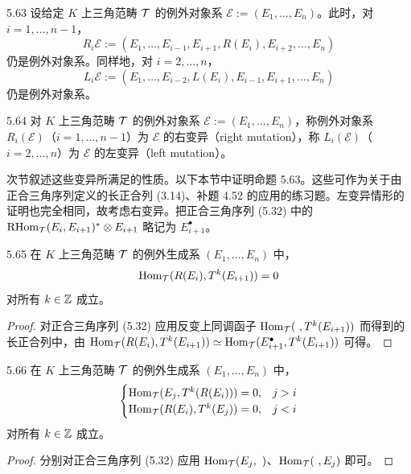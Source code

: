 \begin{proposition}{5.63} 设给定 $K$ 上三角范畴 $\mathcal{T}$ 的例外对象系 $\mathcal{E} := (E_{1},\ldots,E_{n})$。此时，对 $i = 1,\ldots,n-1$，
\[
  R_{i}\mathcal{E} := (E_{1},\ldots,E_{i-1},E_{i+1},R(E_{i}),E_{i+2},\ldots,E_{n})
\]
仍是例外对象系。同样地，对 $i = 2,\ldots,n$，
\[
  L_{i}\mathcal{E} := (E_{1},\ldots,E_{i-2},L(E_{i}),E_{i-1},E_{i+1},\ldots,E_{n})
\]
仍是例外对象系。\end{proposition}

\begin{definition}{5.64} 对 $K$ 上三角范畴 $\mathcal{T}$ 的例外对象系 $\mathcal{E} := (E_{1},\ldots,E_{n})$，称例外对象系 $R_{i}(\mathcal{E})$（$i = 1,\ldots,n-1$）为 $\mathcal{E}$ 的右变异（right mutation），称 $L_{i}(\mathcal{E})$（$i = 2,\ldots,n$）为 $\mathcal{E}$ 的左变异（left mutation）。\end{definition}

次节叙述这些变异所满足的性质。以下本节中证明命题 5.63。这些可作为关于由正合三角序列定义的长正合列 (3.14)、补题 4.52 的应用的练习题。左变异情形的证明也完全相同，故考虑右变异。把正合三角序列 (5.32) 中的 $\operatorname{RHom}_{\mathcal{T}}(E_{i},E_{i+1})^{*}\otimes E_{i+1}$ 略记为 $E^{\bullet}_{i+1}$。

\begin{lemma}{5.65} 在 $K$ 上三角范畴 $\mathcal{T}$ 的例外生成系 $(E_{1},\ldots,E_{n})$ 中，
\[
  \operatorname{Hom}_{\mathcal{T}}(R(E_{i}),T^{k}(E_{i+1})) = 0
\]
对所有 $k \in \mathbb{Z}$ 成立。\end{lemma}

\begin{proof}
对正合三角序列 (5.32) 应用反变上同调函子 $\operatorname{Hom}_{\mathcal{T}}(\ ,T^{k}(E_{i+1}))$ 而得到的长正合列中，由 $\operatorname{Hom}_{\mathcal{T}}(R(E_{i}),T^{k}(E_{i+1})) \simeq \operatorname{Hom}_{\mathcal{T}}(E^{\bullet}_{i+1},T^{k}(E_{i+1}))$ 可得。
\end{proof}

\begin{lemma}{5.66} 在 $K$ 上三角范畴 $\mathcal{T}$ 的例外生成系 $(E_{1},\ldots,E_{n})$ 中，
\[
  \begin{cases}
    \operatorname{Hom}_{\mathcal{T}}(E_{j},T^{k}(R(E_{i}))) = 0, & j > i\\
    \operatorname{Hom}_{\mathcal{T}}(R(E_{i}),T^{k}(E_{j})) = 0, & j < i
  \end{cases}
\]
对所有 $k \in \mathbb{Z}$ 成立。\end{lemma}

\begin{proof}
分别对正合三角序列 (5.32) 应用 $\operatorname{Hom}_{\mathcal{T}}(E_{j},\ )$、$\operatorname{Hom}_{\mathcal{T}}(\ ,E_{j})$ 即可。
\end{proof}

